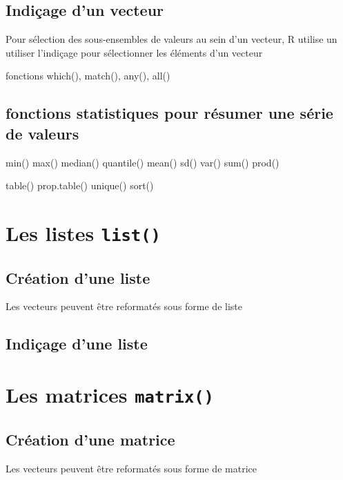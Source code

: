 \documentclass[
]{book}
\begin{document}
\subsection{Indiçage d'un vecteur}\label{indiuxe7age-dun-vecteur}

Pour sélection des sous-ensembles de valeurs au sein d'un vecteur, R utilise un
utiliser l'indiçage pour sélectionner les éléments d'un vecteur

fonctions which(), match(), any(), all()

\subsection{fonctions statistiques pour résumer une série de valeurs}\label{fonctions-statistiques-pour-ruxe9sumer-une-suxe9rie-de-valeurs}

min() max() median() quantile()
mean() sd() var()
sum() prod()

table()
prop.table()
unique()
sort()

\section{\texorpdfstring{Les listes \texttt{list()}}{Les listes list()}}\label{les-listes-list}

\subsection{Création d'une liste}\label{cruxe9ation-dune-liste}

Les vecteurs peuvent être reformatés sous forme de liste

\subsection{Indiçage d'une liste}\label{indiuxe7age-dune-liste}

\section{\texorpdfstring{Les matrices \texttt{matrix()}}{Les matrices matrix()}}\label{les-matrices-matrix}

\subsection{Création d'une matrice}\label{cruxe9ation-dune-matrice}

Les vecteurs peuvent être reformatés sous forme de matrice
\end{document}
